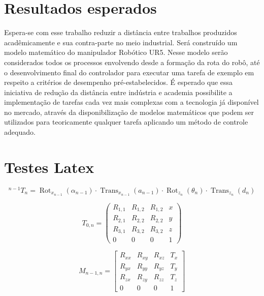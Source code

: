 \section{Resultados esperados}  

Espera-se com esse trabalho reduzir a distância entre trabalhos produzidos acadêmicamente e sua contra-parte no meio industrial. Será construído um modelo matemático do manipulador Robótico UR5. Nesse modelo serão considerados todos os processos envolvendo desde a formação da rota do robô, até o desenvolvimento final do controlador para executar uma tarefa de exemplo em respeito a critérios de desempenho pré-estabelecidos. 
É esperado que essa iniciativa de redução da distância entre indústria e academia possibilite a implementação de tarefas cada vez mais complexas com a tecnologia já disponível no mercado, através da disponibilização de modelos matemáticos que podem ser utilizados para teoricamente qualquer tarefa aplicando um método de controle adequado. 


\section{Testes Latex}  
\begin{equation}
{}^{n - 1}T_n  =
\operatorname{Rot}_{x_{n-1}}(\alpha_{n-1}) \cdot \operatorname{Trans}_{x_{n-1}}(a_{n-1}) \cdot \operatorname{Rot}_{z_{n}}(\theta_n) \cdot \operatorname{Trans}_{z_{n}}(d_n)
\end{equation}

\begin{equation}
T_{0,n} = 
\begin{pmatrix}
R_{1,1} & R_{1,2} & R_{1,2} & x \\
R_{2,1} & R_{2,2} & R_{2,2} & y \\
R_{3,1} & R_{3,2} & R_{3,2} & z \\
0 & 0 & 0 & 1
\end{pmatrix}
\end{equation}


\begin{equation}
M_{n-1,n} =  \left[ \begin{array}{ccc|c} R_{xx} & R_{xy} & R_{xz} & T_x \\ R_{yx} & R_{yy} & R_{yz} & T_y \\ R_{zx} & R_{zy} & R_{zz} & T_z \\
\hline
0 & 0 & 0 & 1 \end{array}\right]
\end{equation}

